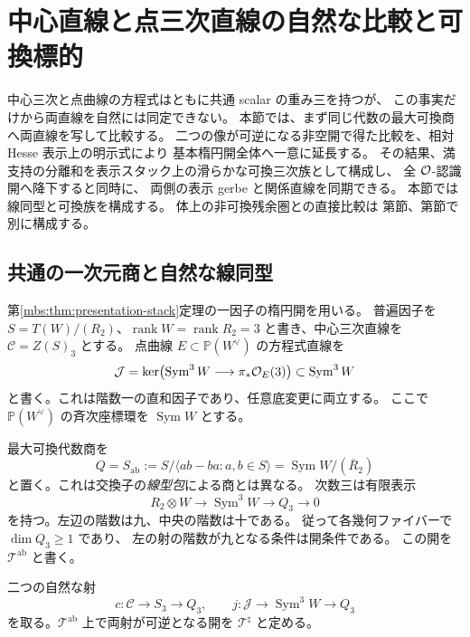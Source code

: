 \section{中心直線と点三次直線の自然な比較と可換標的}
\label{mbpl:sec:point-line}

中心三次と点曲線の方程式はともに共通 scalar の重み三を持つが、
この事実だけから両直線を自然には同定できない。
本節では、まず同じ代数の最大可換商へ両直線を写して比較する。
二つの像が可逆になる非空開で得た比較を、相対 Hesse 表示上の明示式により
基本楕円開全体へ一意に延長する。
その結果、満支持の分離和を表示スタック上の滑らかな可換三次族として構成し、
全 $\mathcal O$-認識開へ降下すると同時に、
両側の表示 gerbe と関係直線を同期できる。
本節では線同型と可換族を構成する。
体上の非可換残余圏との直接比較は
第節、第節で別に構成する。

\subsection{共通の一次元商と自然な線同型}

第\ref{mbs:thm:presentation-stack}定理の一因子の楕円開を用いる。
普遍因子を $S=T(W)/(R_2)$、$\operatorname{rank}W=
\operatorname{rank}R_2=3$ と書き、中心三次直線を
$\mathcal C=Z(S)_3$ とする。
点曲線 $E\subset\mathbb P(W^\vee)$ の方程式直線を
\[
 \mathcal J=\ker\bigl(\operatorname{Sym}^3W
                  \longrightarrow\pi_*\mathcal O_E(3)\bigr)
       \subset\operatorname{Sym}^3W
\]
と書く。これは階数一の直和因子であり、任意底変更に両立する。
ここで $\mathbb P(W^\vee)$ の斉次座標環を $\operatorname{Sym}W$ とする。

最大可換代数商を
\begin{equation}\label{mbpl:eq:abelianization}
 Q=S_{\mathrm{ab}}
   :=S/\langle ab-ba:a,b\in S\rangle
   =\operatorname{Sym}W/(\overline R_2)
\end{equation}
と置く。これは交換子の\emph{線型包}による商とは異なる。
次数三は有限表示
\begin{equation}\label{mbpl:eq:finite-presentation}
 R_2\otimes W\longrightarrow\operatorname{Sym}^3W
       \longrightarrow Q_3\longrightarrow0
\end{equation}
を持つ。左辺の階数は九、中央の階数は十である。
従って各幾何ファイバーで $\dim Q_3\geq1$ であり、
左の射の階数が九となる条件は開条件である。
この開を $\mathcal T^{\mathrm{ab}}$ と書く。

二つの自然な射
\begin{equation}\label{mbpl:eq:two-maps}
 c:\mathcal C\longrightarrow S_3\longrightarrow Q_3,
 \qquad
 j:\mathcal J\longrightarrow\operatorname{Sym}^3W\longrightarrow Q_3
\end{equation}
を取る。$\mathcal T^{\mathrm{ab}}$ 上で両射が可逆となる開を
$\mathcal T^\natural$ と定める。

